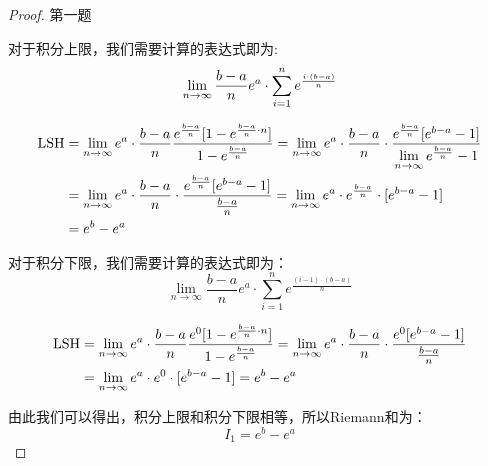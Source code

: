 \begin{proof}\textsf{第一题}

对于积分上限，我们需要计算的表达式即为:
\[
    \lim_{n\to\infty}{\frac{b-a}{n}e^a\cdot \sum_{i=1}^{n}{e^{\frac{i\cdot(b-a)}{n}}}}\nonumber \\
\]

\begin{align*}
    {\rm LSH}
    &=\lim_{n\to\infty}
    {
        e^a\cdot\frac{b-a}{n}\frac{e^{\frac{b-a}{n}}[1-e^{\frac{b-a}{n}\cdot n}]}{1-e^{\frac{b-a}{n}}}
    }
    =\lim_{n\to\infty}
    {
        e^a\cdot\frac{b-a}{n}\cdot\frac{e^{ \frac{b-a}{n} }[e^{b-a}-1]}{\lim\limits_{n\to\infty}{   e^{  \frac{b-a}{n} }   }-1}
    }\\
    &=\lim_{n\to\infty}
    {
        e^a\cdot\frac{b-a}{n}\cdot
        \frac{e^{\frac{b-a}{n}}[e^{b-a}-1]}  {\frac{b-a}{n}}
    }
    =\lim_{n\to\infty}
    {
        e^a\cdot e^{\frac{b-a}{n}}\cdot[e^{b-a}-1] 
    }\\
    &=e^b-e^a
\end{align*}   


对于积分下限，我们需要计算的表达式即为：
\[
    \lim_{n\to\infty}{\frac{b-a}{n}e^a\cdot \sum_{i=1}^{n}{e^{\frac{(i-1)\cdot(b-a)}{n}}}}\nonumber
\]


\begin{align*}
    {\rm LSH}
    &=\lim_{n\to\infty}
    {
        e^a\cdot\frac{b-a}{n}\frac{e^{0}[1-e^{\frac{b-a}{n}\cdot n}]}{1-e^{\frac{b-a}{n}}}
    }
    =\lim_{n\to\infty}
    {
        e^a\cdot\frac{b-a}{n}\cdot
        \frac{e^{0}[e^{b-a}-1]}  {\frac{b-a}{n}}
    }\\ 
    &=\lim_{n\to\infty}
    {
        e^a\cdot e^{0}\cdot[e^{b-a}-1] 
    }
    =e^b-e^a\nonumber
\end{align*}

由此我们可以得出，积分上限和积分下限相等，所以Riemann和为：
\[
I_1=e^b-e^a
\]
\end{proof}


